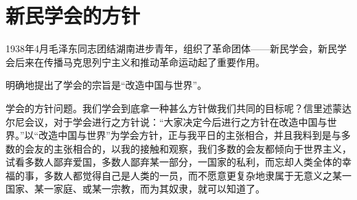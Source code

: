 \section[新民学会的方针（一九一八年四月）]{新民学会的方针}



1938年4月毛泽东同志团结湖南进步青年，组织了革命团体——新民学会，新民学会后来在传播马克思列宁主义和推动革命运动起了重要作用。

明确地提出了学会的宗旨是“改造中国与世界”。

学会的方针问题。我们学会到底拿一种甚么方针做我们共同的目标呢？信里述蒙达尔尼会议，对于学会进行之方针说：“大家决定今后进行之方针在改造中国与世界。”以“改造中国与世界”为学会方针，正与我平日的主张相合，并且我料到是与多数的会友的主张相合的，以我的接触和观察，我们多数的会友都倾向于世界主义，试看多数人鄙弃爱国，多数人鄙弃某一部分，一国家的私利，而忘却人类全体的幸福的事，多数人都觉得自己是人类的一员，而不愿意更复杂地隶属于无意义之某一国家、某一家庭、或某一宗教，而为其奴隶，就可以知道了。

